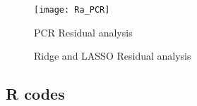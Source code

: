 \documentclass[12pt,doublespace]{article}
\begin{document}
	\begin{figure}
		\centering
		\texttt{[image: Ra\_PCR]}
		\caption{PCR Residual analysis}
		\label{fig:rapcr}
	\end{figure}
	
		\begin{figure}[h]
		\centering
		\hfill
		\caption{ Ridge and LASSO Residual analysis}
		\label{fig:RL}
	\end{figure}
	
	\clearpage
	\subsection {R codes}
\end{document}
